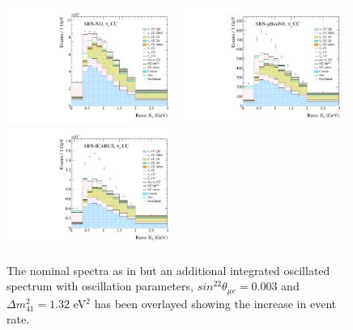\begin{figure}[h!]
  {\includegraphics[width=0.49\textwidth]{figures-chap6/spectra/nue_app_dmsq_1.32_sinsq_0.003_overlay_spectrum_sbn_nd_BNB_FHC_0_modes.pdf}}
  {\includegraphics[width=0.49\textwidth]{figures-chap6/spectra/nue_app_dmsq_1.32_sinsq_0.003_overlay_spectrum_sbn_uboone_BNB_FHC_1_modes.pdf}}
  {\includegraphics[width=0.49\textwidth]{figures-chap6/spectra/nue_app_dmsq_1.32_sinsq_0.003_overlay_spectrum_sbn_icarus_BNB_FHC_2_modes.pdf}}
  \captionsetup{width=0.49\textwidth}
  \parbox[b]{0.49\textwidth}%
  {
    \caption[SBN \nue appearance CC inclusive reconstructed neutrino energy spectra with oscillated spectrum overlayed.]{The nominal spectra as in  but an additional integrated oscillated spectrum with oscillation parameters, $sin^22\theta_{\mu e} = 0.003$ and $\Delta m^2_{41} = 1.32$ eV$^2$ has been overlayed showing the increase in event rate.\\\\\\}
    \label{fig:nue_spectra_with_osc_overlay} 
  }
\end{figure}

